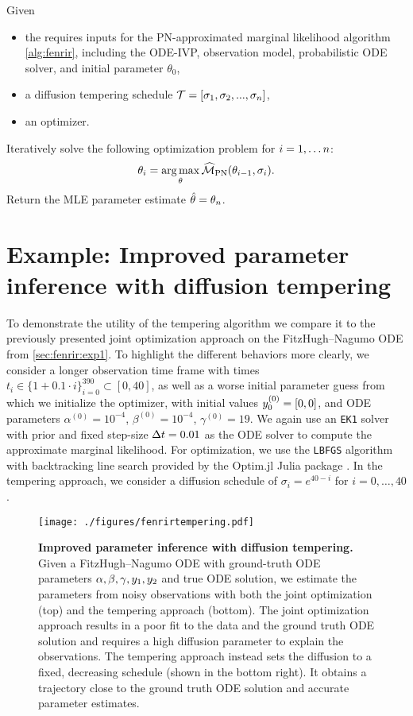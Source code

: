 \documentclass{mimosis}
\begin{document}
\begin{alg}
\algeqspacing
\label{alg:tempering}
Given
\begin{itemize}[nosep]
\item the requires inputs for the PN-approximated marginal likelihood algorithm \ref{alg:fenrir}, including the ODE-IVP, observation model, probabilistic ODE solver, and initial parameter \(\theta_0\),
\item a diffusion tempering schedule
\(\mathcal{T}=[\sigma_1, \sigma_2, ..., \sigma_n]\),
\item an optimizer.
\end{itemize}
Iteratively solve the following optimization problem for \(i=1, \dots n\):
\begin{equation}
  \theta_{i} = \argmax_\theta \PNML \left( \theta_{i-1}, \sdiff_i \right).
\end{equation}
Return the MLE parameter estimate \(\hat{\theta}=\theta_n\).
\end{alg}
\section{Example: Improved parameter inference with diffusion tempering}
\label{sec:org4bf07c8}
To demonstrate the utility of the tempering algorithm we compare it to the previously presented joint optimization approach on the FitzHugh--Nagumo ODE from \cref{sec:fenrir:exp1}.
To highlight the different behaviors more clearly, we consider a longer observation time frame with times \(t_i \in \{1 + 0.1 \cdot i\}_{i=0}^{390} \subset [0, 40]\), as well as a worse initial parameter guess from which we initialize the optimizer,
with initial values \(y_0^{(0)}=[0, 0]\),
and ODE parameters \(\alpha^{(0)}=10^{-4}\), \(\beta^{(0)}=10^{-4}\), \(\gamma^{(0)}=19\).
We again use an \texttt{EK1} solver with  prior and fixed step-size \({\Delta t} = 0.01\) as the ODE solver to compute the approximate marginal likelihood.
For optimization, we use the \texttt{LBFGS} algorithm with backtracking line search \parencite{nocedal1999numerical} provided by the Optim.jl Julia package \parencite{optimjl}.
In the tempering approach, we consider a diffusion schedule of \(\sigma_i = e^{40 - i}\) for \(i = 0, \dots, 40\).

\begin{figure}[t]
\centering
\texttt{[image: ./figures/fenrirtempering.pdf]}
\caption{\label{fig:fenrir:temperingdemo}\textbf{Improved parameter inference with diffusion tempering.} Given a FitzHugh--Nagumo ODE with ground-truth ODE parameters \(\alpha, \beta, \gamma, y_1, y_2\) and true ODE solution, we estimate the parameters from noisy observations with both the joint optimization (top) and the tempering approach (bottom). The joint optimization approach results in a poor fit to the data and the ground truth ODE solution and requires a high diffusion parameter to explain the observations. The tempering approach instead sets the diffusion to a fixed, decreasing schedule (shown in the bottom right). It obtains a trajectory close to the ground truth ODE solution and accurate parameter estimates.}
\end{figure}
\end{document}
